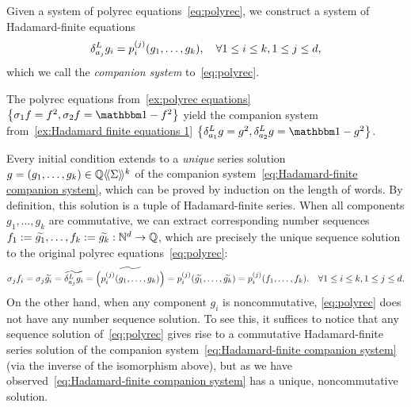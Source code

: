 Given a system of polyrec equations~\cref{eq:polyrec},
we construct a system of Hadamard-finite equations
%
\begin{align}
    \label{eq:Hadamard-finite companion system}
    \delta^L_{a_j} g_i = p^{(j)}_i(g_1, \dots, g_k),
    \quad \forall 1 \leq i \leq k, 1 \leq j \leq d,
\end{align}
%
which we call the \emph{companion system} to~\cref{eq:polyrec}.
%
\begin{example}
    The polyrec equations from~\cref{ex:polyrec equations}
    $\set{\shift 1 f = f^2, \shift 2 f = \one-f^2}$
    yield the companion system from~\cref{ex:Hadamard finite equations 1}
    $\set{\deriveleft {a_1} g = g^2, \deriveleft {a_2} g = \one - g^2}$.
\end{example}
%
\noindent
Every initial condition extends to a \emph{unique} series solution $g = (g_1, \dots, g_k) \in \mathbb Q\langle\!\langle\Sigma\rangle\!\rangle^k$
of the companion system~\cref{eq:Hadamard-finite companion system},
which can be proved by induction on the length of words.
%
By definition, this solution is a tuple of Hadamard-finite series.
%
When all components $g_1, \dots, g_k$ are commutative,
we can extract corresponding number sequences
$f_1 := \widetilde {g_1}, \dots, f_k := \widetilde {g_k} : \mathbb N^d \to \mathbb Q$,
which are precisely the unique sequence solution
to the original polyrec equations~\cref{eq:polyrec}:
%
\begin{align*}
    \sigma_{j} {f_i}
   = \sigma_{j} \widetilde {g_i}
    = \widetilde {\delta^L_{a_j} g_i}
    = \widetilde {\left(p^{(j)}_i(g_1, \dots, g_k)\right)}
   = p^{(j)}_i(\widetilde {g_1}, \dots, \widetilde {g_k})
    = p^{(j)}_i(f_1, \dots, f_k).
    \quad \forall 1 \leq i \leq k, 1 \leq j \leq d.
\end{align*}
%
On the other hand, when any component $g_i$ is noncommutative,
\cref{eq:polyrec} does not have any number sequence solution.
%
To see this, it suffices to notice that any sequence solution of~\cref{eq:polyrec}
gives rise to a commutative Hadamard-finite series solution of the companion system~\cref{eq:Hadamard-finite companion system}
(via the inverse of the isomorphism above),
but as we have observed~\cref{eq:Hadamard-finite companion system} has a unique, noncommutative solution.

